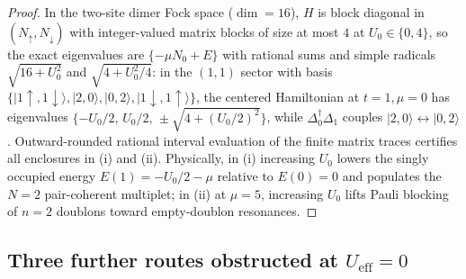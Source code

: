\documentclass[11pt]{article}
\theoremstyle{definition}
\theoremstyle{remark}
\newcommand{\eff}{\mathrm{eff}}
\newcommand{\Ueff}{U_{\eff}}
\begin{document}
\begin{proof}
In the two-site dimer Fock space ($\dim=16$), $H$ is block diagonal in
$(N_\uparrow,N_\downarrow)$ with integer-valued matrix blocks of size at most $4$ at
$U_0\in\{0,4\}$, so the exact eigenvalues are $\{-\mu N_0+E\}$ with rational sums
and simple radicals $\sqrt{16+U_0^2}$ and $\sqrt{4+U_0^2/4}$: in the $(1,1)$ sector
with basis $\{|1\uparrow,1\downarrow\rangle,|2,0\rangle,|0,2\rangle,
|1\downarrow,1\uparrow\rangle\}$, the centered Hamiltonian at $t=1,\mu=0$ has
eigenvalues $\{-U_0/2,\,U_0/2,\,\pm\sqrt{4+(U_0/2)^2}\}$, while $\Delta_0^\dagger
\Delta_1$ couples $|2,0\rangle\leftrightarrow|0,2\rangle$. Outward-rounded rational
interval evaluation of the finite matrix traces certifies all enclosures in (i) and
(ii). Physically, in (i) increasing $U_0$ lowers the singly occupied energy
$E(1)=-U_0/2-\mu$ relative to $E(0)=0$ and populates the $N=2$ pair-coherent
multiplet; in (ii) at $\mu=5$, increasing $U_0$ lifts Pauli blocking of $n=2$
doublons toward empty-doublon resonances.
\end{proof}

\subsection{Three further routes obstructed at \texorpdfstring{$\Ueff=0$}{U\_eff = 0}}
\end{document}
